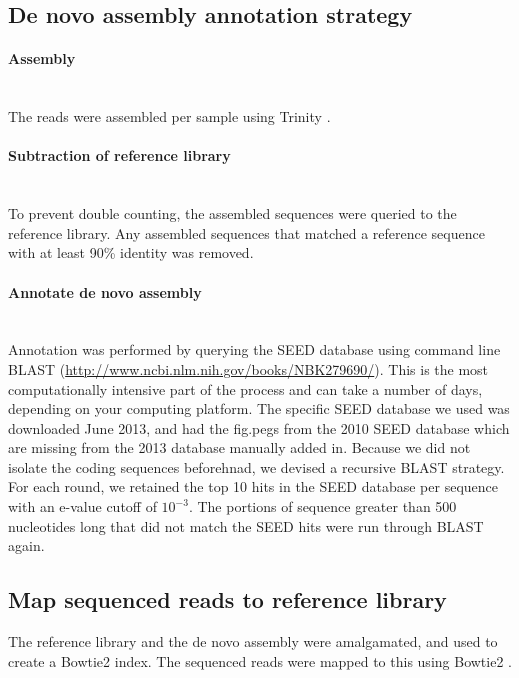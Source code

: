 \subsection{De novo assembly annotation strategy}

\paragraph{Assembly}\mbox{}\\
The reads were assembled per sample using Trinity \cite{haas2013novo}.

\paragraph{Subtraction of reference library}\mbox{}\\
To prevent double counting, the assembled sequences were queried to the reference library. Any assembled sequences that matched a reference sequence with at least 90\% identity was removed.

\paragraph{Annotate de novo assembly}\mbox{}\\
Annotation was performed by querying the SEED database \cite{overbeek2005subsystems} using command line BLAST (\url{http://www.ncbi.nlm.nih.gov/books/NBK279690/}). This is the most computationally intensive part of the process and can take a number of days, depending on your computing platform. The specific SEED database we used was downloaded June 2013, and had the fig.pegs from the 2010 SEED database which are missing from the 2013 database manually added in. Because we did not isolate the coding sequences beforehnad, we devised a recursive BLAST strategy. For each round, we retained the top 10 hits in the SEED database per sequence with an e-value cutoff of $10^{-3}$. The portions of sequence greater than 500 nucleotides long that did not match the SEED hits were run through BLAST again.

\subsection{Map sequenced reads to reference library}
The reference library and the de novo assembly were amalgamated, and used to create a Bowtie2 index. The sequenced reads were mapped to this using Bowtie2 \cite{langmead2012fast}.

